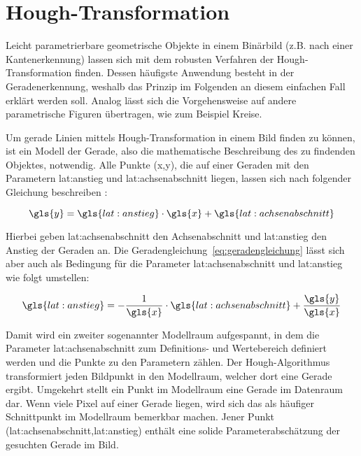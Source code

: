 \section{Hough-Transformation}

Leicht parametrierbare geometrische Objekte in einem Binärbild (z.B. nach einer Kantenerkennung) lassen sich mit dem robusten Verfahren der Hough-Transformation finden. Dessen häufigste Anwendung besteht in der Geradenerkennung, weshalb das Prinzip im Folgenden an diesem einfachen Fall erklärt werden soll. Analog lässt sich die Vorgehensweise auf andere parametrische Figuren übertragen, wie zum Beispiel Kreise.

Um gerade Linien mittels Hough-Transformation in einem Bild finden zu können, ist ein Modell der Gerade, also die mathematische Beschreibung des zu findenden Objektes, notwendig. Alle Punkte (\gls{x},\gls{y}), die auf einer Geraden mit den Parametern \gls{lat:anstieg} und \gls{lat:achsenabschnitt} liegen, lassen sich nach folgender Gleichung beschreiben \autocite{jaehneDigitaleBildverarbeitungMit2005}:

\begin{equation}
\gls{y} = \gls{lat:anstieg} \cdot \gls{x} + \gls{lat:achsenabschnitt}
\label{eq:geradengleichung}
\end{equation}

Hierbei geben \gls{lat:achsenabschnitt} den Achsenabschnitt und \gls{lat:anstieg} den Anstieg der Geraden an. Die Geradengleichung~\ref{eq:geradengleichung} lässt sich aber auch als Bedingung für die Parameter \gls{lat:achsenabschnitt} und \gls{lat:anstieg} wie folgt umstellen:

\begin{equation}
\gls{lat:anstieg} = -\frac{1}{\gls{x}} \cdot \gls{lat:achsenabschnitt} + \frac{\gls{y}}{\gls{x}}
\end{equation}

Damit wird ein zweiter sogenannter Modellraum aufgespannt, in dem die Parameter \gls{lat:achsenabschnitt} zum Definitions- und Wertebereich definiert werden und die Punkte zu den Parametern zählen. Der Hough-Algorithmus transformiert jeden Bildpunkt in den Modellraum, welcher dort eine Gerade ergibt. Umgekehrt stellt ein Punkt im Modellraum eine Gerade im Datenraum dar. Wenn viele Pixel auf einer Gerade liegen, wird sich das als häufiger Schnittpunkt im Modellraum bemerkbar machen. Jener Punkt (\gls{lat:achsenabschnitt},\gls{lat:anstieg}) enthält eine solide Parameterabschätzung der gesuchten Gerade im Bild.

